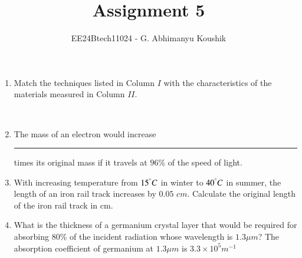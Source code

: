 \documentclass[journal,12pt,onecolumn]{IEEEtran}
\theoremstyle{remark}
\begin{document}
\title{Assignment 5}
\author{EE24Btech11024 - G. Abhimanyu Koushik}
\maketitle
\renewcommand{\thefigure}{\theenumi}
\renewcommand{\thetable}{\theenumi}
\begin{enumerate}

\item Match the techniques listed in Column $I$ with the characteristics of the materials measured in Column $II$.
\\\begin{table}[h!]    
  \centering
  
\end{table}\\

\hfill{}
\begin{enumerate}
\end{enumerate}

\item The mass of an electron would increase \rule{1cm}{0.15mm} times its original mass if it travels at $96\%$ of the speed of light.

\hfill{}

\item With increasing temperature from $15^\degree C$ in winter to $40^\degree C$ in summer, the length of an iron rail track increases by $0.05$ $cm$. Calculate the original length of the iron rail track in cm. \\

\hfill{}

\item What is the thickness of a germanium crystal layer that would be required for absorbing $80\%$ of the incident radiation whose wavelength is $1.3 \mu m$? The absorption coefficient \brak{\alpha} of germanium at $1.3 \mu m$ is $3.3\times 10^5 m^{-1}$

\hfill{}


\end{enumerate}
\end{document}
